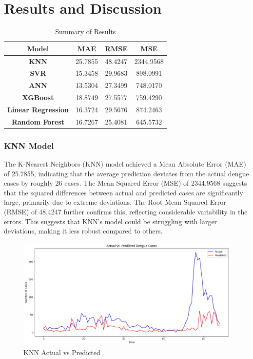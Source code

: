 \documentclass[runningheads]{llncs}
\begin{document}
\section{Results and Discussion}
\begin{table}[h!]
\centering
\begin{tabular}{||c | c | c | c||} 
 \hline
 \textbf{Model} & \textbf{MAE} & \textbf{RMSE} & \textbf{MSE} \\ [1ex] 
 \hline
 \textbf{KNN} & 25.7855 & 48.4247 & 2344.9568 \\ 
 \hline
 \textbf{SVR} & 15.3458 & 29.9683 & 898.0991 \\
 \hline
 \textbf{ANN} & 13.5304 & 27.3499 & 748.0170 \\
 \hline
 \textbf{XGBoost} & 18.8749 & 27.5577 & 759.4290 \\
 \hline
 \textbf{Linear Regression} & 16.3724 & 29.5676 & 874.2463 \\ 
 \hline
 \textbf{Random Forest} & 16.7267 & 25.4081 & 645.5732 \\ [1ex] 
 \hline
\end{tabular}
\caption{Summary of Results}
\label{table:summary}
\end{table}

\subsubsection{KNN Model}
The K-Nearest Neighbors (KNN) model achieved a Mean Absolute Error (MAE) of 25.7855, indicating that the average prediction deviates from the actual dengue cases by roughly 26 cases. The Mean Squared Error (MSE) of 2344.9568 suggests that the squared differences between actual and predicted cases are significantly large, primarily due to extreme deviations. The Root Mean Squared Error (RMSE) of 48.4247 further confirms this, reflecting considerable variability in the errors. This suggests that KNN's model could be struggling with larger deviations, making it less robust compared to others.
\begin{figure}[h!]
    \centering
    \includegraphics[width=1\linewidth]{image/knn plot.png}
    \caption{KNN Actual vs Predicted}
    \label{fig:knn}
\end{figure}
\end{document}
